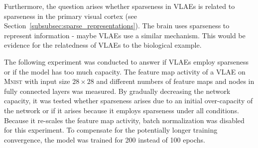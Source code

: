 Furthermore, the question arises whether sparseness in \acp{VLAE} is related to sparseness in the primary visual cortex (see Section~\ref{subsubsec:sparse_representations}).
The brain uses sparseness to represent information - maybe \acp{VLAE} use a similar mechanism.
This would be evidence for the relatedness of \acp{VLAE} to the biological example.

The following experiment was conducted to answer if \acp{VLAE} employ sparseness or if the model has too much capacity.
The feature map activity of a \ac{VLAE} on \textsc{Mnist} with input size $28\times 28$ and different numbers of feature maps and nodes in fully connected layers was measured.
By gradually decreasing the network capacity, it was tested whether sparseness arises due to an initial over-capacity of the network or if it arises because it employs sparseness under all conditions.
Because it re-scales the feature map activity, batch normalization was disabled for this experiment.
To compensate for the potentially longer training convergence, the model was trained for 200 instead of 100 epochs.

